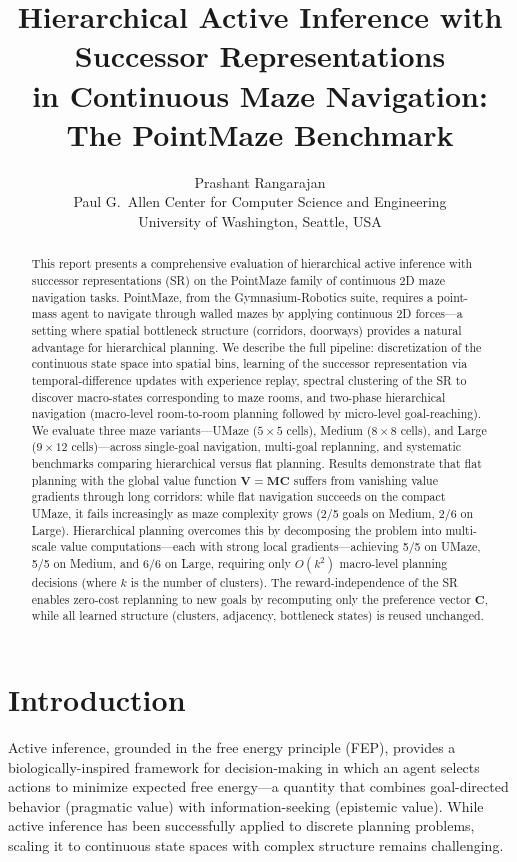 \documentclass[11pt,a4paper]{article}
\title{Hierarchical Active Inference with Successor Representations\\
in Continuous Maze Navigation:\\
The PointMaze Benchmark}
\author{Prashant Rangarajan\\
Paul G.\ Allen Center for Computer Science and Engineering\\
University of Washington, Seattle, USA}
\date{}
\newcommand{\M}{\mathbf{M}}
\newcommand{\C}{\mathbf{C}}
\newcommand{\V}{\mathbf{V}}
\begin{document}
\maketitle

\begin{abstract}
This report presents a comprehensive evaluation of hierarchical active inference with successor representations (SR) on the PointMaze family of continuous 2D maze navigation tasks.
PointMaze, from the Gymnasium-Robotics suite, requires a point-mass agent to navigate through walled mazes by applying continuous 2D forces---a setting where spatial bottleneck structure (corridors, doorways) provides a natural advantage for hierarchical planning.
We describe the full pipeline: discretization of the continuous state space into spatial bins, learning of the successor representation via temporal-difference updates with experience replay, spectral clustering of the SR to discover macro-states corresponding to maze rooms, and two-phase hierarchical navigation (macro-level room-to-room planning followed by micro-level goal-reaching).
We evaluate three maze variants---UMaze ($5 \times 5$ cells), Medium ($8 \times 8$ cells), and Large ($9 \times 12$ cells)---across single-goal navigation, multi-goal replanning, and systematic benchmarks comparing hierarchical versus flat planning.
Results demonstrate that flat planning with the global value function $\V = \M\C$ suffers from vanishing value gradients through long corridors: while flat navigation succeeds on the compact UMaze, it fails increasingly as maze complexity grows (2/5 goals on Medium, 2/6 on Large).
Hierarchical planning overcomes this by decomposing the problem into multi-scale value computations---each with strong local gradients---achieving 5/5 on UMaze, 5/5 on Medium, and 6/6 on Large, requiring only $O(k^2)$ macro-level planning decisions (where $k$ is the number of clusters).
The reward-independence of the SR enables zero-cost replanning to new goals by recomputing only the preference vector $\C$, while all learned structure (clusters, adjacency, bottleneck states) is reused unchanged.
\end{abstract}

\section{Introduction}
\label{sec:intro}

Active inference, grounded in the free energy principle (FEP), provides a biologically-inspired framework for decision-making in which an agent selects actions to minimize expected free energy---a quantity that combines goal-directed behavior (pragmatic value) with information-seeking (epistemic value).
While active inference has been successfully applied to discrete planning problems, scaling it to continuous state spaces with complex structure remains challenging.
\end{document}
